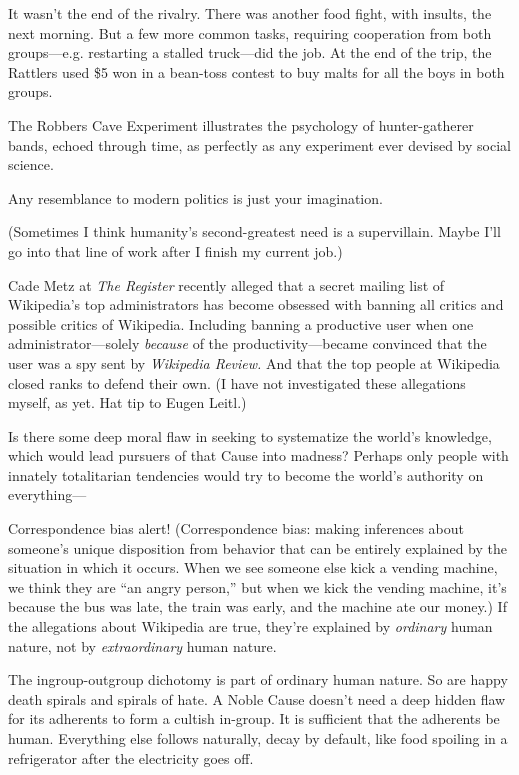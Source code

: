 {
 It wasn't the end of the rivalry. There was
another food fight, with insults, the next morning. But a few more
common tasks, requiring cooperation from both groups---e.g. restarting
a stalled truck---did the job. At the end of the trip, the Rattlers
used \$5 won in a bean-toss contest to buy malts for all the boys in
both groups.}

{
 The Robbers Cave Experiment illustrates the psychology of
hunter-gatherer bands, echoed through time, as perfectly as any
experiment ever devised by social science.}

{
 Any resemblance to modern politics is just your imagination.}

{
 (Sometimes I think humanity's second-greatest need
is a supervillain. Maybe I'll go into that line of work
after I finish my current job.)}

\myendsectiontext


\bigskip


{
 Cade Metz at \textit{The Register} recently alleged that a secret
mailing list of Wikipedia's top administrators has
become obsessed with banning all critics and possible critics of
Wikipedia. Including banning a productive user when one
administrator---solely \textit{because} of the productivity---became
convinced that the user was a spy sent by \textit{Wikipedia Review.}
And that the top people at Wikipedia closed ranks to defend their own.
(I have not investigated these allegations myself, as yet. Hat tip to
Eugen Leitl.) }

{
 Is there some deep moral flaw in seeking to systematize the
world's knowledge, which would lead pursuers of that
Cause into madness? Perhaps only people with innately totalitarian
tendencies would try to become the world's authority on
everything---}

{
 Correspondence bias alert! (Correspondence bias: making inferences
about someone's unique disposition from behavior that
can be entirely explained by the situation in which it occurs. When we
see someone else kick a vending machine, we think they are
``an angry person,'' but when we
kick the vending machine, it's because the bus was
late, the train was early, and the machine ate our money.) If the
allegations about Wikipedia are true, they're explained
by \textit{ordinary} human nature, not by \textit{extraordinary} human
nature.}

{
 The ingroup-outgroup dichotomy is part of ordinary human nature.
So are happy death spirals and spirals of hate. A Noble Cause
doesn't need a deep hidden flaw for its adherents to
form a cultish in-group. It is sufficient that the adherents be human.
Everything else follows naturally, decay by default, like food spoiling
in a refrigerator after the electricity goes off.}

